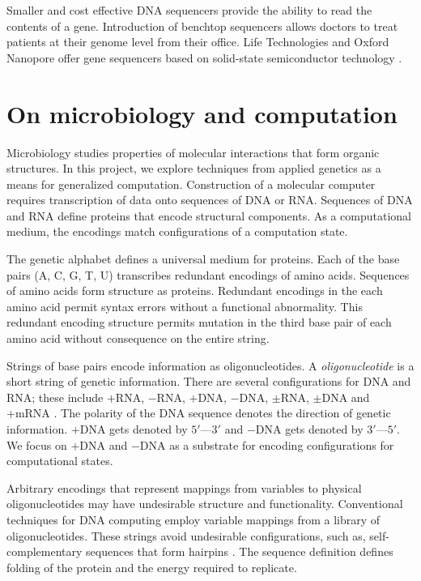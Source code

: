 		
Smaller and cost effective DNA sequencers provide the ability to read the contents of a gene. Introduction of benchtop sequencers allows doctors to treat patients at their genome level from their office. Life Technologies and Oxford Nanopore offer gene sequencers based on solid-state semiconductor technology \cite{ionTorrent, oxfordNanopore}.	

\section{On microbiology and computation}

	
	Microbiology studies properties of molecular interactions that form organic structures.  In this project, we explore techniques from applied genetics as a means for generalized computation.  Construction of a molecular computer requires transcription of data onto sequences of DNA or RNA.  Sequences of DNA and RNA define proteins that encode structural components.  As a computational medium, the encodings match configurations of a computation state. 
	
		
	The genetic alphabet defines a universal medium for proteins.  Each of the base pairs (A, C, G, T, U) transcribes redundant encodings of amino acids.  Sequences of amino acids form structure as proteins.  Redundant encodings in the each amino acid permit syntax errors without a functional abnormality.  This redundant encoding structure permits mutation in the third base pair of each amino acid without consequence on the entire string.

	
	Strings of base pairs encode information as oligonucleotides.  A \textit{oligonucleotide} is a short string of genetic information.  There are several configurations for DNA and RNA; these include $+$RNA, $-$RNA, $+$DNA, $-$DNA, $\pm$RNA, $\pm$DNA and +mRNA \cite{baltimore1971exp}.  The polarity of the DNA sequence denotes the direction of genetic information.  $+$DNA gets denoted by $5'$---$3'$ and $-$DNA gets denoted by $3'$---$5'$.  We focus on $+$DNA and $-$DNA as a substrate for encoding configurations for computational states.
	
	Arbitrary encodings that represent mappings from variables to physical oligonucleotides may have undesirable structure and functionality.  Conventional techniques for DNA computing employ variable mappings from a library of oligonucleotides.  These strings avoid undesirable configurations, such as, self-complementary sequences that form hairpins \cite{dnaComputingModels2008}.  The sequence definition defines folding of the protein and the energy required to replicate. 
	
